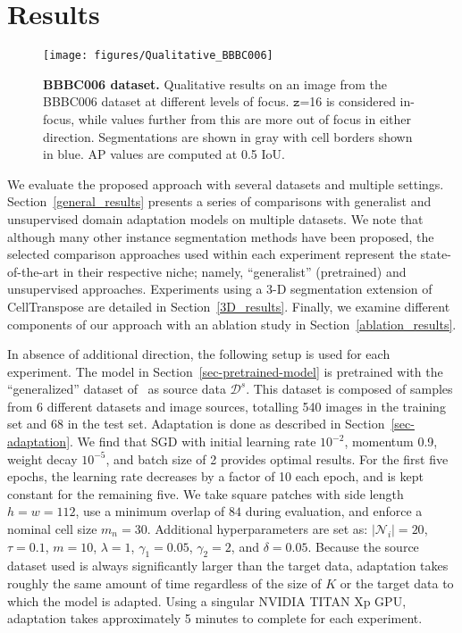 \chapter{Results} %

\label{Chapter5} %

\begin{figure*}[ht!]
\centering
\texttt{[image: figures/Qualitative\_BBBC006]}
\caption{\textbf{BBBC006 dataset.} Qualitative results on an image from the BBBC006 dataset at different levels of focus. $\mathtt{z}$=16 is considered in-focus, while values further from this are more out of focus in either direction. Segmentations are shown in gray with cell borders shown in blue. AP values are computed at 0.5 IoU.}
\label{fig:qualitative_results}
\end{figure*}


\noindent
We evaluate the proposed approach with several datasets and multiple settings. Section~\ref{general_results} presents a series of comparisons with generalist and unsupervised domain adaptation models on multiple datasets. We note that although many other instance segmentation methods have been proposed, the selected comparison approaches used within each experiment represent the state-of-the-art in their respective niche; namely, ``generalist'' (pretrained) and unsupervised approaches. Experiments using a 3-D segmentation extension of CellTranspose are detailed in Section~\ref{3D_results}. Finally, we examine different components of our approach with an ablation study in Section~\ref{ablation_results}.

In absence of additional direction, the following setup is used for each experiment. The model in Section~\ref{sec-pretrained-model} is pretrained with the ``generalized'' dataset of~\cite{Stringer2021-yw} as source data $\mathcal{D}^s$. This dataset is composed of samples from 6 different datasets and image sources, totalling 540 images in the training set and 68 in the test set. Adaptation is done as described in Section~\ref{sec-adaptation}. We find that SGD with initial learning rate $10^{-2}$, momentum 0.9, weight decay $10^{-5}$, and batch size of 2 provides optimal results. For the first five epochs, the learning rate decreases by a factor of 10 each epoch, and is kept constant for the remaining five. We take square patches with side length $h=w=112$, use a minimum overlap of $84$ during evaluation, and enforce a nominal cell size $m_n=30$. Additional hyperparameters are set as: $| \mathcal{N}_i |=20$, $\tau=0.1$, $m=10$, $\lambda=1$, $\gamma_1=0.05$, $\gamma_2=2$, and $\delta=0.05$. Because the source dataset used is always significantly larger than the target data, adaptation takes roughly the same amount of time regardless of the size of $K$ or the target data to which the model is adapted. Using a singular NVIDIA TITAN Xp GPU, adaptation takes approximately 5 minutes to complete for each experiment.

